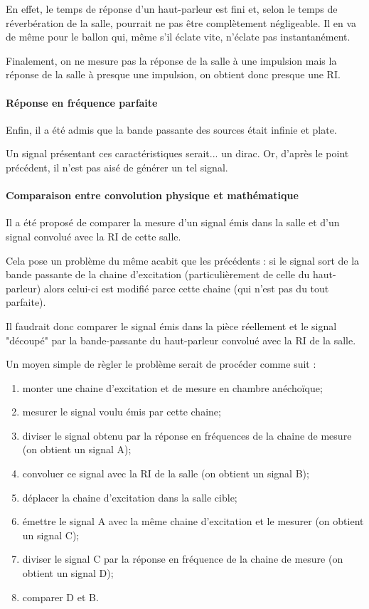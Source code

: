 \documentclass[12pt]{article}
\begin{document}
En effet, le temps de réponse d'un haut-parleur est fini et, selon le temps de réverbération de la salle, pourrait ne
pas être complètement négligeable. Il en va de même pour le ballon qui, même s'il éclate vite, n'éclate pas
instantanément.

Finalement, on ne mesure pas la réponse de la salle à une impulsion mais la réponse de la salle à presque une impulsion,
on obtient donc presque une RI.

\paragraph{Réponse en fréquence parfaite}

Enfin, il a été admis que la bande passante des sources était infinie et plate.

Un signal présentant ces caractéristiques serait... un dirac. Or, d'après le point précédent, il n'est pas aisé de
générer un tel signal.
\paragraph{Comparaison entre convolution physique et mathématique}

Il a été proposé de comparer la mesure d'un signal émis dans la salle et d'un signal convolué avec la RI de cette salle.

Cela pose un problème du même acabit que les précédents : si le signal sort de la bande passante de la chaine
d'excitation (particulièrement de celle du haut-parleur) alors celui-ci est modifié parce cette chaine (qui n'est pas du
tout parfaite).

Il faudrait donc comparer le signal émis dans la pièce réellement et le signal "découpé" par la bande-passante du
haut-parleur convolué avec la RI de la salle.

Un moyen simple de règler le problème serait de procéder comme suit :

\begin{enumerate}
    \item monter une chaine d'excitation et de mesure en chambre anéchoïque;
    \item mesurer le signal voulu émis par cette chaine;
    \item diviser le signal obtenu par la réponse en fréquences de la chaine de mesure (on obtient un signal A);
    \item convoluer ce signal avec la RI de la salle (on obtient un signal B);
    \item déplacer la chaine d'excitation dans la salle cible;
    \item émettre le signal A avec la même chaine d'excitation et le mesurer (on obtient un signal C);
    \item diviser le signal C par la réponse en fréquence de la chaine de mesure (on obtient un signal D);
    \item comparer D et B.
\end{enumerate}
\end{document}
